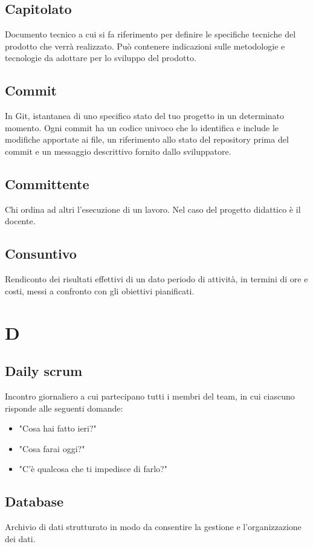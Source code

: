     \subsection{Capitolato}
    Documento tecnico a cui si fa riferimento per definire le specifiche tecniche 
    del prodotto che verrà realizzato. Può contenere indicazioni sulle metodologie e
    tecnologie da adottare per lo sviluppo del prodotto.
    \subsection{Commit}
    In Git, istantanea di uno specifico stato del tuo progetto in un determinato momento.
    Ogni commit ha un codice univoco che lo identifica e include le modifiche apportate ai file,
    un riferimento allo stato del repository prima del commit e un messaggio descrittivo fornito dallo sviluppatore.
    \subsection{Committente}
    Chi ordina ad altri l'esecuzione di un lavoro. Nel caso del progetto didattico
    è il docente.
    \subsection{Consuntivo}
    Rendiconto dei risultati effettivi di un dato periodo di attività, 
    in termini di ore e costi, messi a confronto con gli obiettivi pianificati.
\section{D}
    \subsection{Daily scrum}
    Incontro giornaliero a cui partecipano tutti i membri del team, in cui ciascuno
    risponde alle seguenti domande:
    \begin{itemize}
        \item "Cosa hai fatto ieri?"
        \item "Cosa farai oggi?"
        \item "C'è qualcosa che ti impedisce di farlo?"
    \end{itemize}
    \subsection{Database}
    Archivio di dati strutturato in modo da consentire la gestione e 
    l'organizzazione dei dati.
